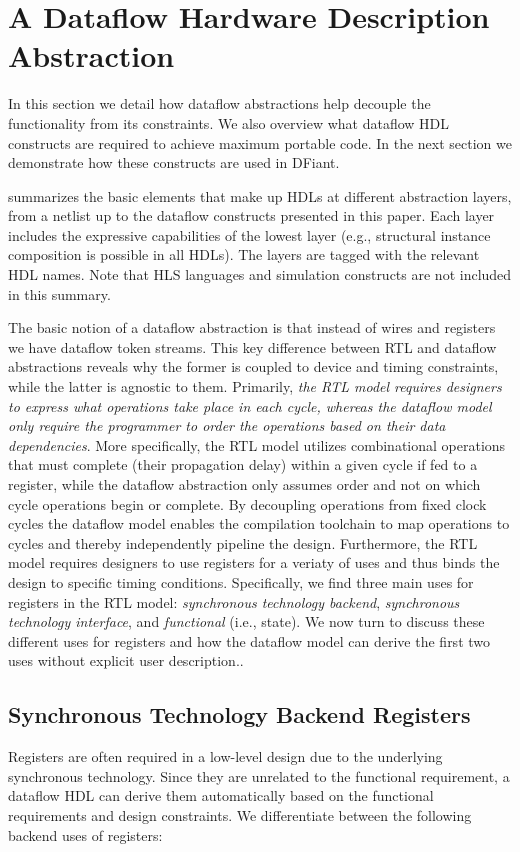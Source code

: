 \section{A Dataflow Hardware Description Abstraction}
\label{sec:motivation}
In this section we detail how dataflow abstractions help decouple the functionality from its constraints. We also overview what dataflow HDL constructs are required to achieve maximum portable code. In the next section we demonstrate how these constructs are used in DFiant.

 summarizes the basic elements that make up HDLs at different abstraction layers, from a netlist up to the dataflow constructs presented in this paper. Each layer includes the expressive capabilities of the lowest layer (e.g., structural instance composition is possible in all HDLs). The layers are tagged with the relevant HDL names. Note that HLS languages and simulation constructs are not included in this summary. 

The basic notion of a dataflow abstraction is that instead of wires and registers we have dataflow token streams. This key difference between RTL and dataflow abstractions reveals why the former is coupled to device and timing constraints, while the latter is agnostic to them. Primarily, \emph{the RTL model requires designers to express what operations take place in each cycle, whereas the dataflow model only require the programmer to order the operations based on their data dependencies}. More specifically, the RTL model utilizes combinational operations that must complete (their propagation delay) within a given cycle if fed to a register, while the dataflow abstraction only assumes order and not on which cycle operations begin or complete. By decoupling operations from fixed clock cycles the dataflow model enables the compilation toolchain to map operations to cycles and thereby independently pipeline the design. Furthermore, the RTL model requires designers to use registers for a veriaty of uses and thus binds the design to specific timing conditions. Specifically, we find three main uses for registers in the RTL model: \emph{synchronous technology backend}, \emph{synchronous technology interface}, and \emph{functional} (i.e., state). We now turn to discuss these different uses for registers and how the dataflow model can derive the first two uses without explicit user description..

\subsection{Synchronous Technology Backend Registers}
Registers are often required in a low-level design due to the underlying synchronous technology. Since they are unrelated to the functional requirement, a dataflow HDL can derive them automatically based on the functional requirements and design constraints. 
We differentiate between the following backend uses of registers:
